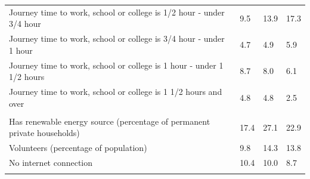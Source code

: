 \documentclass{article}
\begin{document}
\begin{table}[h]
\begin{tabular}{KTTT}
Journey time to work, school or college is 1/2 hour - under 3/4 hour &  9.5& 13.9& 17.3\\
Journey time to work, school or college is 3/4 hour - under 1 hour & 4.7& 4.9& 5.9\\
Journey time to work, school or college is 1 hour - under 1 1/2 hours & 8.7& 8.0& 6.1\\
Journey time to work, school or college is 1 1/2 hours and over & 4.8& 4.8& 2.5\\
\hline
    \\ 
    \hline
Has renewable energy source (percentage of permanent private households) & 17.4& 27.1& 22.9\\
    \hline
Volunteers (percentage of population) &  9.8& 14.3& 13.8\\
    \hline
No internet connection& 10.4& 10.0&  8.7\\
\hline
\end{tabular}
\end{table}
\end{document}
